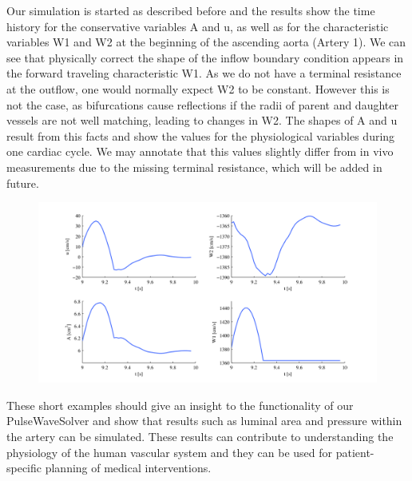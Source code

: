 Our simulation is started as described before and the results show the time
history for the conservative variables A and u, as well as for the
characteristic variables W1 and W2 at the beginning of the ascending aorta
(Artery 1). We can see that physically correct the shape of the inflow boundary
condition appears in the forward traveling characteristic W1. As we do not have
a terminal resistance at the outflow, one would normally expect W2 to be
constant. However this is not the case, as bifurcations cause reflections if the
radii of parent and daughter vessels are not well matching, leading to changes
in W2. The shapes of A and u result from this facts and show the values for the
physiological variables during one cardiac cycle. We may annotate that this
values slightly differ from in vivo measurements due to the missing terminal
resistance, which will be added in future.

\begin{figure}
	\includegraphics[width=\linewidth]{Figures/Network_Results.png}
\end{figure}

These short examples should give an insight to the functionality of our
PulseWaveSolver and show that results such as luminal area and pressure within
the artery can be simulated. These results can contribute to understanding the
physiology of the human vascular system and they can be used for
patient-specific planning of medical interventions.



